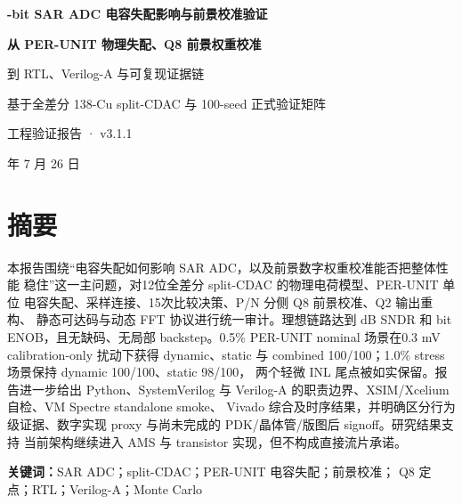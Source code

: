 \documentclass[UTF8,11pt,a4paper]{ctexart}
\begin{document}
\begin{titlepage}
  \thispagestyle{empty}
  \centering
  \vspace*{48mm}
  {\bfseries\rmfamily\fontsize{27}{34}-bit SAR ADC 电容失配影响与前景校准验证\par}
  \vspace{8mm}
  {\bfseries\rmfamily\fontsize{17}{24}\selectfont
    从 PER-UNIT 物理失配、Q8 前景权重校准\par
    到 RTL、Verilog-A 与可复现证据链\par}
  \vspace{18mm}
  {\large\rmfamily
    基于全差分 138-Cu split-CDAC 与 100-seed 正式验证矩阵\par}
  \vfill
  {\large\rmfamily 工程验证报告 · v3.1.1\par}
  \vspace{5mm}
  {\large{} 年 7 月 26 日\par}
  \vspace*{26mm}
\end{titlepage}

\pagestyle{plain}
\section*{摘要}

本报告围绕“电容失配如何影响 SAR ADC，以及前景数字权重校准能否把整体性能
稳住”这一主问题，对12位全差分 split-CDAC 的物理电荷模型、PER-UNIT 单位
电容失配、采样连接、15次比较决策、P/N 分侧 Q8 前景校准、Q2 输出重构、
静态可达码与动态 FFT 协议进行统一审计。理想链路达到 \IdealCalSndr{} dB
SNDR 和 \IdealCalEnob{} bit ENOB，且无缺码、无局部 backstep。0.5\%
PER-UNIT nominal 场景在0.3 mV calibration-only 扰动下获得 dynamic、static
与 combined 100/100；1.0\% stress 场景保持 dynamic 100/100、static 98/100，
两个轻微 INL 尾点被如实保留。报告进一步给出 Python、SystemVerilog 与
Verilog-A 的职责边界、XSIM/Xcelium 自检、VM Spectre standalone smoke、
Vivado 综合及时序结果，并明确区分行为级证据、数字实现 proxy 与尚未完成的
PDK/晶体管/版图后 signoff。研究结果支持
当前架构继续进入 AMS 与 transistor 实现，但不构成直接流片承诺。

\vspace{6mm}
\noindent\textbf{关键词：}SAR ADC；split-CDAC；PER-UNIT 电容失配；前景校准；
Q8 定点；RTL；Verilog-A；Monte Carlo
\end{document}
